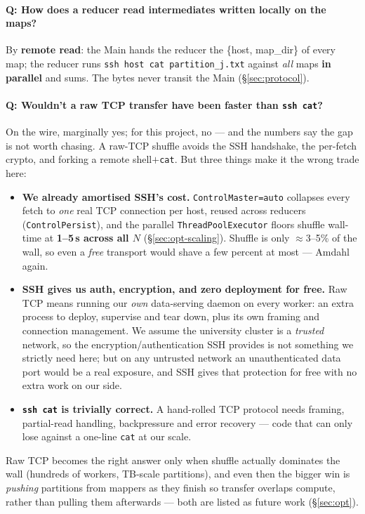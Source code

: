 \documentclass[11pt,a4paper]{article}
\newcommand{\code}[1]{\texttt{\small #1}}
\begin{document}
\paragraph{Q: How does a reducer read intermediates written locally on the maps?}
By \textbf{remote read}: the Main hands the reducer the \{host, map\_dir\} of
every map; the reducer runs \code{ssh host cat partition\_j.txt} against \emph{all}
maps \textbf{in parallel} and sums. The bytes never transit the Main
(\S\ref{sec:protocol}).

\paragraph{Q: Wouldn't a raw TCP transfer have been faster than \code{ssh cat}?}
On the wire, marginally yes; for this project, no --- and the numbers say the gap
is not worth chasing. A raw-TCP shuffle avoids the SSH handshake, the per-fetch
crypto, and forking a remote shell$+$\code{cat}. But three things make it the
wrong trade here:
\begin{itemize}[leftmargin=1.4em]
  \item \textbf{We already amortised SSH's cost.} \code{ControlMaster=auto}
  collapses every fetch to \emph{one} real TCP connection per host, reused across
  reducers (\code{ControlPersist}), and the parallel \code{ThreadPoolExecutor}
  floors shuffle wall-time at \textbf{1--5\,s across all $N$}
  (\S\ref{sec:opt-scaling}). Shuffle is only $\approx$3--5\% of the wall, so even
  a \emph{free} transport would shave a few percent at most --- Amdahl again.
  \item \textbf{SSH gives us auth, encryption, and zero deployment for free.} Raw
  TCP means running our \emph{own} data-serving daemon on every worker: an extra
  process to deploy, supervise and tear down, plus its own framing and
  connection management. We assume the university cluster is a \emph{trusted}
  network, so the encryption/authentication SSH provides is not something we
  strictly need here; but on any untrusted network an unauthenticated data port
  would be a real exposure, and SSH gives that protection for free with no extra
  work on our side.
  \item \textbf{\code{ssh cat} is trivially correct.} A hand-rolled TCP protocol
  needs framing, partial-read handling, backpressure and error recovery --- code
  that can only lose against a one-line \code{cat} at our scale.
\end{itemize}
Raw TCP becomes the right answer only when shuffle actually dominates the wall
(hundreds of workers, TB-scale partitions), and even then the bigger win is
\emph{pushing} partitions from mappers as they finish so transfer overlaps
compute, rather than pulling them afterwards --- both are listed as future work
(\S\ref{sec:opt}).
\end{document}
